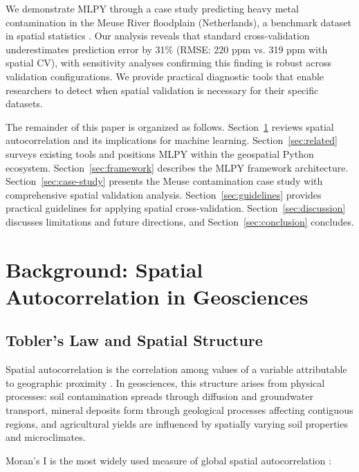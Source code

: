 \documentclass[review,12pt]{elsarticle}
\begin{document}
We demonstrate MLPY through a case study predicting heavy metal contamination in the Meuse River floodplain (Netherlands), a benchmark dataset in spatial statistics \citep{rikken1996geostatistics}. Our analysis reveals that standard cross-validation underestimates prediction error by 31\% (RMSE: 220 ppm vs. 319 ppm with spatial CV), with sensitivity analyses confirming this finding is robust across validation configurations. We provide practical diagnostic tools that enable researchers to detect when spatial validation is necessary for their specific datasets.

The remainder of this paper is organized as follows. Section~\ref{sec:background} reviews spatial autocorrelation and its implications for machine learning. Section~\ref{sec:related} surveys existing tools and positions MLPY within the geospatial Python ecosystem. Section~\ref{sec:framework} describes the MLPY framework architecture. Section~\ref{sec:case-study} presents the Meuse contamination case study with comprehensive spatial validation analysis. Section~\ref{sec:guidelines} provides practical guidelines for applying spatial cross-validation. Section~\ref{sec:discussion} discusses limitations and future directions, and Section~\ref{sec:conclusion} concludes.


\section{Background: Spatial Autocorrelation in Geosciences}\label{sec:background}

\subsection{Tobler's Law and Spatial Structure}

Spatial autocorrelation is the correlation among values of a variable attributable to geographic proximity \citep{legendre1993spatial}. In geosciences, this structure arises from physical processes: soil contamination spreads through diffusion and groundwater transport, mineral deposits form through geological processes affecting contiguous regions, and agricultural yields are influenced by spatially varying soil properties and microclimates.

Moran's I is the most widely used measure of global spatial autocorrelation \citep{moran1950notes}:
\end{document}

